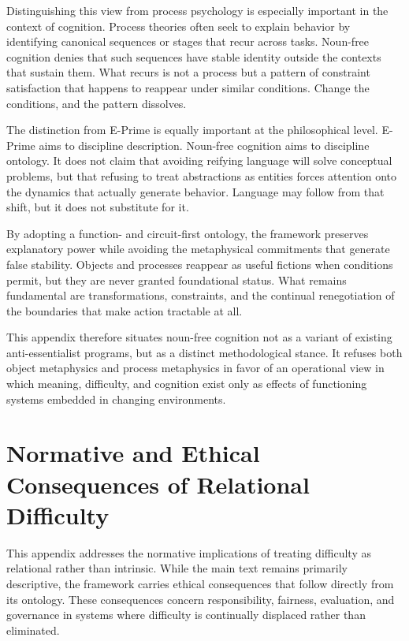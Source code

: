 \documentclass[12pt]{article}
\begin{document}
Distinguishing this view from process psychology is especially important in the context of cognition. Process theories often seek to explain behavior by identifying canonical sequences or stages that recur across tasks. Noun-free cognition denies that such sequences have stable identity outside the contexts that sustain them. What recurs is not a process but a pattern of constraint satisfaction that happens to reappear under similar conditions. Change the conditions, and the pattern dissolves.

The distinction from E-Prime is equally important at the philosophical level. E-Prime aims to discipline description. Noun-free cognition aims to discipline ontology. It does not claim that avoiding reifying language will solve conceptual problems, but that refusing to treat abstractions as entities forces attention onto the dynamics that actually generate behavior. Language may follow from that shift, but it does not substitute for it.

By adopting a function- and circuit-first ontology, the framework preserves explanatory power while avoiding the metaphysical commitments that generate false stability. Objects and processes reappear as useful fictions when conditions permit, but they are never granted foundational status. What remains fundamental are transformations, constraints, and the continual renegotiation of the boundaries that make action tractable at all.

This appendix therefore situates noun-free cognition not as a variant of existing anti-essentialist programs, but as a distinct methodological stance. It refuses both object metaphysics and process metaphysics in favor of an operational view in which meaning, difficulty, and cognition exist only as effects of functioning systems embedded in changing environments.

\section{Normative and Ethical Consequences of Relational Difficulty}

This appendix addresses the normative implications of treating difficulty as relational rather than intrinsic. While the main text remains primarily descriptive, the framework carries ethical consequences that follow directly from its ontology. These consequences concern responsibility, fairness, evaluation, and governance in systems where difficulty is continually displaced rather than eliminated.
\end{document}
